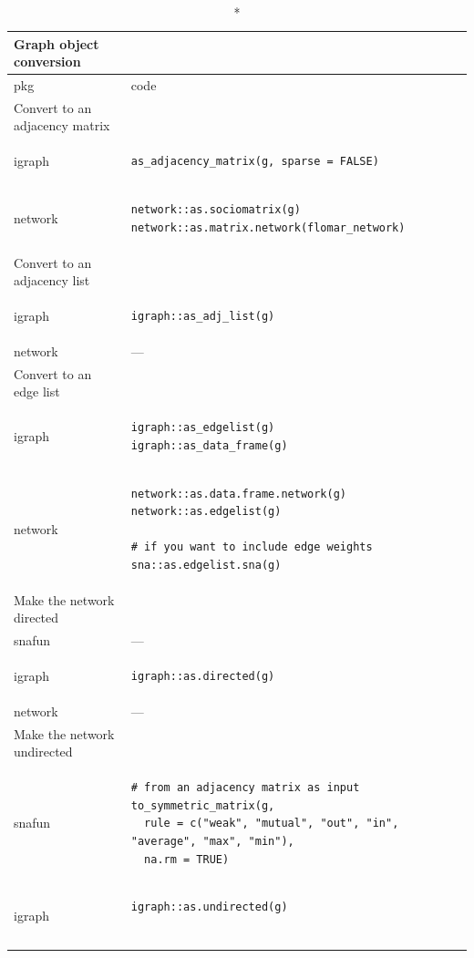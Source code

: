 \documentclass[
]{article}
\begin{document}
\captionsetup[table]{labelformat=empty,skip=1pt}
\begin{longtable}{ll}
\caption*{
{\large Graph object conversion}
} \\ 
\toprule
pkg & code \\ 
\midrule
\multicolumn{1}{l}{Convert to an adjacency matrix} \\ 
\midrule
igraph & \begin{verbatim}
as_adjacency_matrix(g, sparse = FALSE)
\end{verbatim} \\ 
network & \begin{verbatim}
network::as.sociomatrix(g)
network::as.matrix.network(flomar_network)
\end{verbatim} \\ 
\midrule
\multicolumn{1}{l}{Convert to an adjacency list} \\ 
\midrule
igraph & \begin{verbatim}
igraph::as_adj_list(g)
\end{verbatim} \\ 
network & — \\ 
\midrule
\multicolumn{1}{l}{Convert to an edge list} \\ 
\midrule
igraph & \begin{verbatim}
igraph::as_edgelist(g)
igraph::as_data_frame(g)
\end{verbatim} \\ 
network & \begin{verbatim}
network::as.data.frame.network(g)
network::as.edgelist(g)

# if you want to include edge weights
sna::as.edgelist.sna(g)
\end{verbatim} \\ 
\midrule
\multicolumn{1}{l}{Make the network directed} \\ 
\midrule
snafun & — \\ 
igraph & \begin{verbatim}
igraph::as.directed(g)
\end{verbatim} \\ 
network & — \\ 
\midrule
\multicolumn{1}{l}{Make the network undirected} \\ 
\midrule
snafun & \begin{verbatim}
# from an adjacency matrix as input
to_symmetric_matrix(g,
  rule = c("weak", "mutual", "out", "in", "average", "max", "min"),
  na.rm = TRUE)
\end{verbatim} \\ 
igraph & \begin{verbatim}
igraph::as.undirected(g)


\end{verbatim}
\end{longtable}
\end{document}
